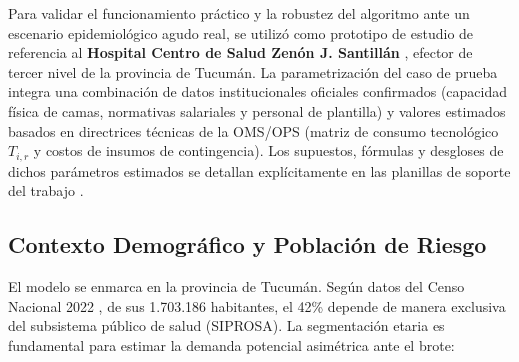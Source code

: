 \documentclass[conference]{IEEEtran}
\begin{document}
Para validar el funcionamiento práctico y la robustez del algoritmo ante un escenario epidemiológico agudo real, se utilizó como prototipo de estudio de referencia al \textbf{Hospital Centro de Salud Zenón J. Santillán} \cite{refMSPT2}, efector de tercer nivel de la provincia de Tucumán. La parametrización del caso de prueba integra una combinación de datos institucionales oficiales confirmados (capacidad física de camas, normativas salariales y personal de plantilla) y valores estimados basados en directrices técnicas de la OMS/OPS (matriz de consumo tecnológico $T_{i,r}$ y costos de insumos de contingencia). Los supuestos, fórmulas y desgloses de dichos parámetros estimados se detallan explícitamente en las planillas de soporte del trabajo \cite{refGP}.

\subsection{Contexto Demográfico y Población de Riesgo}
El modelo se enmarca en la provincia de Tucumán. Según datos del Censo Nacional 2022 \cite{ref12}, de sus 1.703.186 habitantes, el 42\% depende de manera exclusiva del subsistema público de salud (SIPROSA). La segmentación etaria es fundamental para estimar la demanda potencial asimétrica ante el brote:
\end{document}

